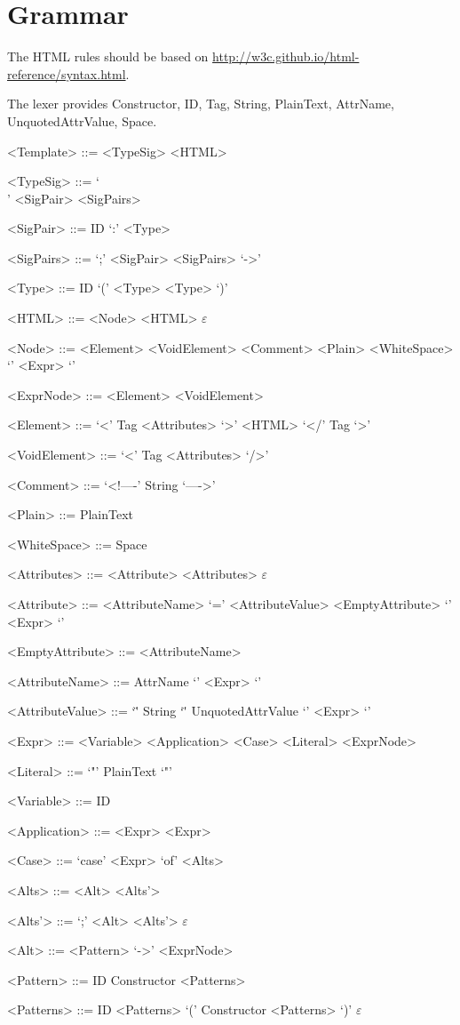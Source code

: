 \documentclass{report}
\begin{document}
\setlength{\grammarparsep}{4pt} %
\setlength{\grammarindent}{12em} %

\section*{Grammar}

The HTML rules should be based on
\url{http://w3c.github.io/html-reference/syntax.html}.

The lexer provides Constructor, ID, Tag, String, PlainText,
AttrName, UnquotedAttrValue, Space.

\begin{grammar}

<Template> ::= <TypeSig> <HTML>

<TypeSig> ::= `\\' <SigPair> <SigPairs>

<SigPair> ::= ID `:' <Type>

<SigPairs> ::= `;' <SigPair> <SigPairs>
\alt `->'

<Type> ::= ID
\alt `(' <Type> <Type> `)'

<HTML> ::= <Node> <HTML>
\alt $\varepsilon$

<Node> ::= <Element>
\alt <VoidElement>
\alt <Comment>
\alt <Plain>
\alt <WhiteSpace>
\alt `{' <Expr> `}'

<ExprNode> ::= <Element>
\alt <VoidElement>

<Element> ::= `<' Tag <Attributes> `>' <HTML> `</' Tag `>'

<VoidElement> ::= `<' Tag <Attributes> `/>'

<Comment> ::= `<!----' String `---->'

<Plain> ::= PlainText

<WhiteSpace> ::= Space

<Attributes> ::= <Attribute> <Attributes>
\alt $\varepsilon$

<Attribute> ::= <AttributeName> `=' <AttributeValue>
\alt <EmptyAttribute>
\alt `{' <Expr> `}'

<EmptyAttribute> ::= <AttributeName>

<AttributeName> ::= AttrName
\alt `{' <Expr> `}'

<AttributeValue> ::= `\"' String `\"'
\alt UnquotedAttrValue
\alt `{' <Expr> `}'

<Expr> ::= <Variable>
\alt <Application>
\alt <Case>
\alt <Literal>
\alt <ExprNode>

<Literal> ::= `"' PlainText `"'

<Variable> ::= ID

<Application> ::= <Expr> <Expr>

<Case> ::= `case' <Expr> `of' <Alts>

<Alts> ::= <Alt> <Alts'>

<Alts'> ::= `;' <Alt> <Alts'>
\alt $\varepsilon$

<Alt> ::= <Pattern> `->' <ExprNode>

<Pattern> ::= ID
\alt Constructor <Patterns>

<Patterns> ::= ID <Patterns>
\alt `(' Constructor <Patterns> `)'
\alt $\varepsilon$


\end{grammar}
\end{document}
